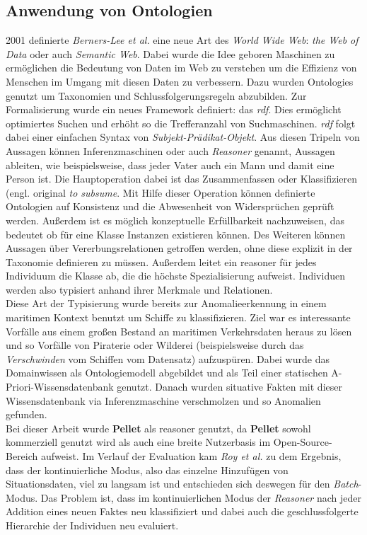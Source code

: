 \subsection{Anwendung von Ontologien}
2001 definierte \textit{Berners-Lee et al.}\cite{berners2001semantic} eine neue Art des \textit{World Wide Web}: \textit{the Web of Data} oder auch \textit{Semantic Web}. Dabei wurde die Idee geboren Maschinen zu ermöglichen die Bedeutung von Daten im Web zu verstehen um die Effizienz von Menschen im Umgang mit diesen Daten zu verbessern\cite{lasi2014industry}. Dazu wurden \Glspl{Ontologie} genutzt um Taxonomien und Schlussfolgerungsregeln abzubilden. Zur Formalisierung wurde ein neues Framework definiert: das \textit{\Gls{rdf}}. Dies ermöglicht optimiertes Suchen und erhöht so die Trefferanzahl von Suchmaschinen\cite{feilmayr2016analysis}. \textit{\Gls{rdf}} folgt dabei einer einfachen Syntax von \textit{Subjekt-Prädikat-Objekt}. Aus diesen Tripeln von Aussagen können Inferenzmaschinen oder auch \textit{Reasoner} genannt, Aussagen ableiten, wie beispielsweise, dass jeder Vater auch ein Mann und damit eine Person ist\cite{roy2010exploitation}. Die Hauptoperation dabei ist das Zusammenfassen oder Klassifizieren (engl. original \textit{to subsume}. Mit Hilfe dieser Operation können definierte Ontologien auf Konsistenz und die Abwesenheit von Widersprüchen geprüft werden. Außerdem ist es möglich konzeptuelle Erfüllbarkeit nachzuweisen, das bedeutet ob für eine Klasse Instanzen existieren können. Des Weiteren können Aussagen über Vererbungsrelationen getroffen werden, ohne diese explizit in der Taxonomie definieren zu müssen. Außerdem leitet ein \Gls{reasoner} für jedes Individuum die Klasse ab, die die höchste Spezialisierung aufweist. Individuen werden also typisiert anhand ihrer Merkmale und Relationen\cite{roy2010exploitation}.\\
Diese Art der Typisierung wurde bereits zur Anomalieerkennung in einem maritimen Kontext benutzt um Schiffe zu klassifizieren. Ziel war es interessante Vorfälle aus einem großen Bestand an maritimen Verkehrsdaten heraus zu lösen und so Vorfälle von Piraterie oder Wilderei (beispielsweise durch das \textit{Verschwinden} vom Schiffen vom Datensatz) aufzuspüren\cite{roy2010exploitation}. Dabei wurde das Domainwissen als Ontologiemodell abgebildet und als Teil einer statischen A-Priori-Wissensdatenbank genutzt. Danach wurden situative Fakten mit dieser Wissensdatenbank via Inferenzmaschine verschmolzen und so Anomalien gefunden.\\
Bei dieser Arbeit wurde \textbf{Pellet}\cite{pellet} als \Gls{reasoner} genutzt, da \textbf{Pellet} sowohl kommerziell genutzt wird als auch eine breite Nutzerbasis im Open-Source-Bereich aufweist. Im Verlauf der Evaluation kam \textit{Roy et al.} zu dem Ergebnis, dass der kontinuierliche Modus, also das einzelne Hinzufügen von Situationsdaten, viel zu langsam ist und entschieden sich deswegen für den \textit{Batch}-Modus. Das Problem ist, dass im kontinuierlichen Modus der \textit{Reasoner} nach jeder Addition eines neuen Faktes neu klassifiziert und dabei auch die geschlussfolgerte Hierarchie der Individuen neu evaluiert\cite[p.~4]{roy2010exploitation}.\\